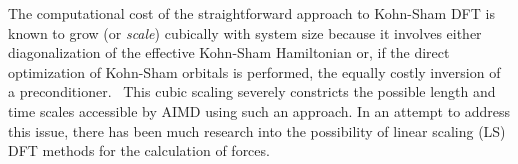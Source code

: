 \documentclass[10pt,aps,prl,twocolumn,amsmath,amssymb,superscriptaddress,longbibliography]{revtex4-1}
\begin{document}
The computational cost of the straightforward approach to Kohn-Sham DFT is known to grow (or \emph{scale}) cubically with system size because it involves either diagonalization of the effective Kohn-Sham Hamiltonian or, if the direct optimization of Kohn-Sham orbitals is performed, the equally costly inversion of a preconditioner.~\cite{a:ot} %
This cubic scaling severely constricts the possible length and time scales accessible by AIMD using such an approach. 
In an attempt to address this issue, there has been much research into the possibility of linear scaling (LS) DFT methods for the calculation of forces.

\end{document}
